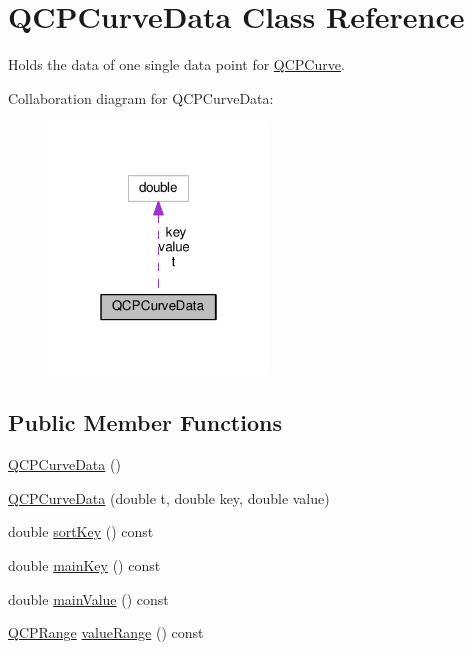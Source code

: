 \hypertarget{classQCPCurveData}{}\section{Q\+C\+P\+Curve\+Data Class Reference}
\label{classQCPCurveData}


Holds the data of one single data point for \hyperlink{classQCPCurve}{Q\+C\+P\+Curve}.  




Collaboration diagram for Q\+C\+P\+Curve\+Data\+:
\nopagebreak
\begin{figure}[H]
\begin{center}
\leavevmode
\includegraphics[width=166pt]{classQCPCurveData__coll__graph}
\end{center}
\end{figure}
\subsection*{Public Member Functions}
\begin{DoxyCompactItemize}
\item 
\hyperlink{classQCPCurveData_a48252779b5198a509d99c69ae223fbf8}{Q\+C\+P\+Curve\+Data} ()
\item 
\hyperlink{classQCPCurveData_a3586be0cc6f8db15bcdd0c0d03b0c173}{Q\+C\+P\+Curve\+Data} (double t, double key, double value)
\item 
double \hyperlink{classQCPCurveData_a5a464c57c73904310db53fa3c6ff8361}{sort\+Key} () const 
\item 
double \hyperlink{classQCPCurveData_a77c24dcafb39e50396f0b1be34c78edc}{main\+Key} () const 
\item 
double \hyperlink{classQCPCurveData_ab2e58a5711ff91a48c9a722fa42fe60b}{main\+Value} () const 
\item 
\hyperlink{classQCPRange}{Q\+C\+P\+Range} \hyperlink{classQCPCurveData_a50b97325b0edd13f6cff590ede62eb3c}{value\+Range} () const 
\end{DoxyCompactItemize}
